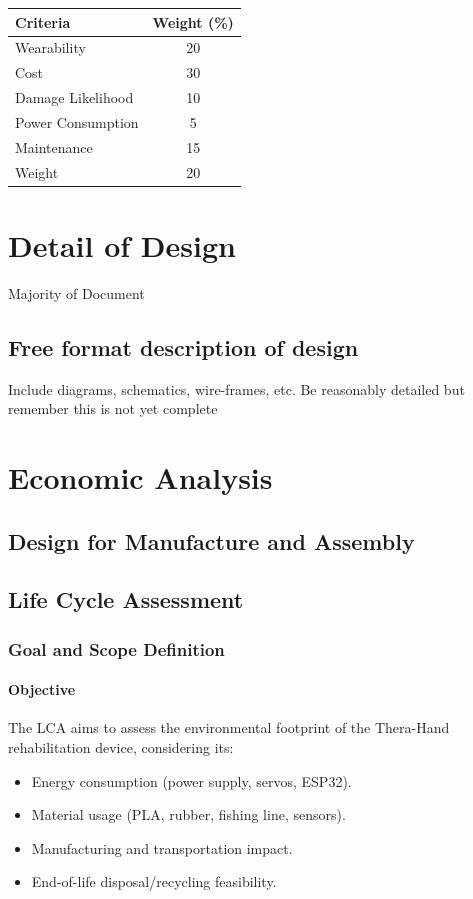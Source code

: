 \documentclass{article}
\begin{document}
\begin{table}[h]
    \centering
    \begin{tabular}{l c}
        \toprule
        \textbf{Criteria} & \textbf{Weight (\%)} \\
        \midrule
        Wearability & 20 \\
        Cost & 30 \\
        Damage Likelihood & 10 \\
        Power Consumption & 5 \\
        Maintenance & 15 \\
        Weight & 20 \\
        \bottomrule
    \end{tabular}
\end{table}

\section{Detail of Design}
Majority of Document

\subsection{Free format description of design}
Include diagrams, schematics, wire-frames, etc.
Be reasonably detailed but remember this is not yet complete

\section{Economic Analysis}

\subsection{Design for Manufacture and Assembly}


\subsection{Life Cycle Assessment}
\subsubsection{Goal and Scope Definition}
\paragraph{Objective}
The LCA aims to assess the environmental footprint of the Thera-Hand rehabilitation device, considering its:
\begin{itemize}
\item Energy consumption (power supply, servos, ESP32).
\item Material usage (PLA, rubber, fishing line, sensors).
\item Manufacturing and transportation impact.
\item End-of-life disposal/recycling feasibility.
\end{itemize}
\end{document}
